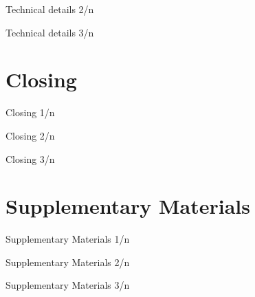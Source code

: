 \begin{frame}{Technical details 2/n}
\blindmathpaper
\end{frame}

\begin{frame}{Technical details 3/n}
\blindmathpaper
\end{frame}

\section{Closing}
\begin{frame}{Closing 1/n}
\blindtext    
\end{frame}

\begin{frame}{Closing 2/n}
\blindtext    
\end{frame}

\begin{frame}{Closing 3/n}
\blindtext    
\end{frame}

\section{Supplementary Materials}
\begin{frame}{Supplementary Materials 1/n}
\blindmathpaper
\end{frame}

\begin{frame}{Supplementary Materials 2/n}
\blindmathpaper
\end{frame}

\begin{frame}{Supplementary Materials 3/n}
\blindmathpaper
\end{frame}